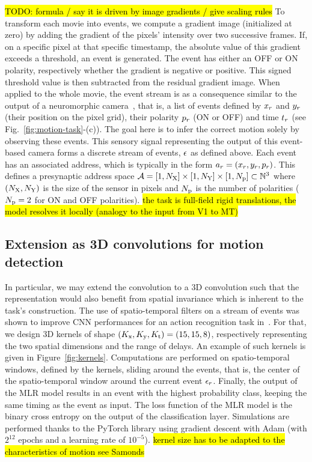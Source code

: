 \documentclass[default]{sn-jnl}%
\theoremstyle{thmstyleone}%
\theoremstyle{thmstyletwo}%
\theoremstyle{thmstylethree}%
\newcommand{\seeFig}[1]{see Fig.~\ref{fig:#1}}%
\DeclareRobustCommand{\note}[1]{{\sethlcolor{yellow}\hl{#1}}}
\begin{document}
\note{ TODO: formula / say it is driven by image gradients / give scaling rules }
To transform each movie into events, we compute a gradient image (initialized at zero) by adding the gradient of the pixels' intensity over two successive frames. If, on a specific pixel at that specific timestamp, the absolute value of this gradient exceeds a threshold, an event is generated. The event has either an OFF or ON polarity, respectively whether the gradient is negative or positive. This signed threshold value is then subtracted from the residual gradient image. When applied to the whole movie, the event stream is as a consequence similar to the output of a neuromorphic camera~\citep{rasetto_challenges_2022}, that is, a list of events defined by $x_r$ and $y_r$ (their position on the pixel grid), their polarity $p_r$ (ON or OFF) and time $t_r$  (\seeFig{motion-task}-(c)). The goal here is to infer the correct motion solely by observing these events. 
This sensory signal representing the output of this event-based camera forms a discrete stream of events, $\epsilon$ as defined above.   
Each event has an associated address, which is typically in the form $a_r=(x_r, y_r, p_r)$. This defines a presynaptic address space $\mathcal{A} = [1, N_\text{X}]\times[1, N_\text{Y}] \times [1, N_\text{p}] \subset \mathbb{N}^3$ where $(N_\text{X}, N_\text{Y})$ is the size of the sensor in pixels and $N_\text{p}$ is the number of polarities  ($N_\text{p}=2$ for ON and OFF polarities). 
\note{ the task is full-field rigid translations, the model resolves it locally (analogy to the input from V1 to MT) }
%
\subsection{Extension as 3D convolutions for motion detection}
In particular, we may extend the convolution to a 3D convolution such that the representation would also benefit from spatial invariance which is inherent to the task's construction. The use of spatio-temporal filters on a stream of events was shown to improve CNN performances for an action recognition task in~\citep{ghosh_spatiotemporal_2019}.
For that, we design 3D kernels of shape  $(K_\text{x}, K_\text{y}, K_\text{t}) = (15, 15, 8)$, respectively representing the two spatial dimensions and the range of delays. An example of such kernels is given in Figure~\ref{fig:kernels}.
Computations are performed on spatio-temporal windows, defined by the kernels, sliding around the events, that is, the center of the spatio-temporal window around the current event $\epsilon_r$.
%
Finally, the output of the MLR model results in an event with the highest probability class, keeping the same timing as the event as input.
%
The loss function of the MLR model is the binary cross entropy on the output of the classification layer. Simulations are performed thanks to the PyTorch library using gradient descent with Adam (with $2^{12}$ epochs and a learning rate of $10^{-5}$). 
%
\note{kernel size has to be adapted to the characteristics of motion see Samonds %
}
%
\end{document}
